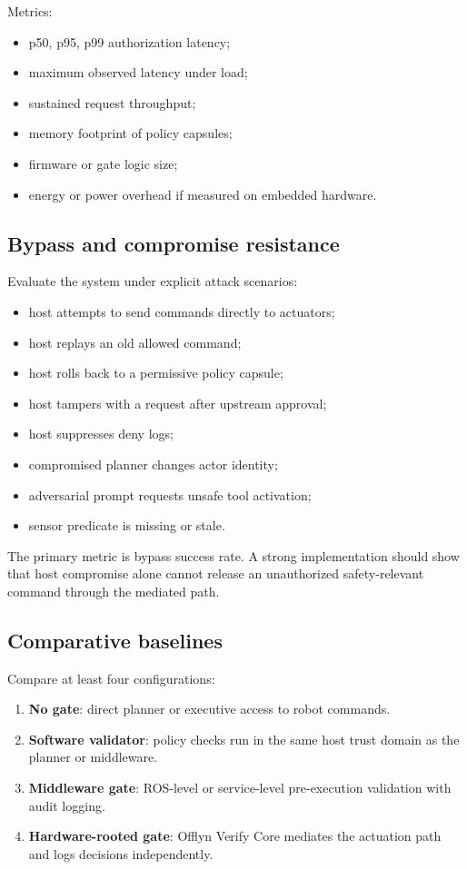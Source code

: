 \documentclass[10pt]{article}
\newcommand{\ovc}{Offlyn Verify Core\xspace}
\begin{document}
Metrics:

\begin{itemize}[leftmargin=*]
  \item p50, p95, p99 authorization latency;
  \item maximum observed latency under load;
  \item sustained request throughput;
  \item memory footprint of policy capsules;
  \item firmware or gate logic size;
  \item energy or power overhead if measured on embedded hardware.
\end{itemize}

\subsection{Bypass and compromise resistance}

Evaluate the system under explicit attack scenarios:

\begin{itemize}[leftmargin=*]
  \item host attempts to send commands directly to actuators;
  \item host replays an old allowed command;
  \item host rolls back to a permissive policy capsule;
  \item host tampers with a request after upstream approval;
  \item host suppresses deny logs;
  \item compromised planner changes actor identity;
  \item adversarial prompt requests unsafe tool activation;
  \item sensor predicate is missing or stale.
\end{itemize}

The primary metric is bypass success rate. A strong implementation should show that host compromise alone cannot release an unauthorized safety-relevant command through the mediated path.

\subsection{Comparative baselines}

Compare at least four configurations:

\begin{enumerate}[leftmargin=*]
  \item \textbf{No gate}: direct planner or executive access to robot commands.
  \item \textbf{Software validator}: policy checks run in the same host trust domain as the planner or middleware.
  \item \textbf{Middleware gate}: ROS-level or service-level pre-execution validation with audit logging.
  \item \textbf{Hardware-rooted gate}: \ovc mediates the actuation path and logs decisions independently.
\end{enumerate}
\end{document}

